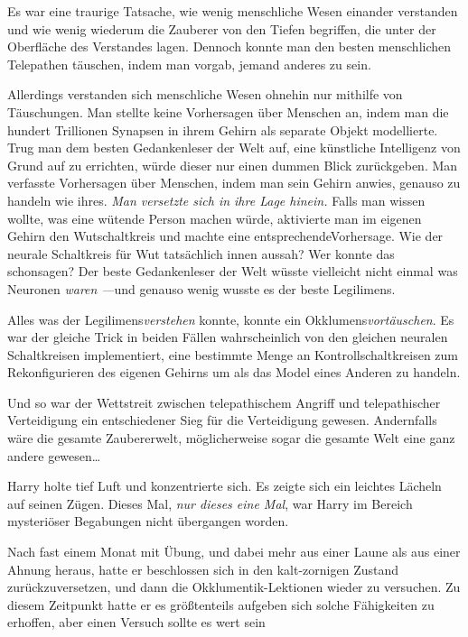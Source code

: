 {Es war eine traurige Tatsache, wie wenig menschliche Wesen einander verstanden und wie wenig wiederum die Zauberer von den Tiefen begriffen, die unter der Oberfläche des Verstandes lagen. Dennoch konnte man den besten menschlichen Telepathen täuschen, indem man vorgab, jemand anderes zu sein.

Allerdings verstanden sich menschliche Wesen ohnehin nur mithilfe von Täuschungen. Man stellte keine Vorhersagen über Menschen an, indem man die hundert Trillionen Synapsen in ihrem Gehirn als separate Objekt modellierte. Trug man dem besten Gedankenleser der Welt auf, eine künstliche Intelligenz von Grund auf zu errichten, würde dieser nur einen dummen Blick zurückgeben. Man verfasste Vorhersagen über Menschen, indem man sein Gehirn anwies, genauso zu handeln wie ihres. \emph{Man versetzte sich in ihre Lage hinein.} Falls man wissen wollte, was eine wütende Person machen würde, aktivierte man im eigenen Gehirn den Wutschaltkreis und machte eine entsprechendeVorhersage. Wie der neurale Schaltkreis für Wut tatsächlich innen aussah? Wer konnte das schonsagen? Der beste Gedankenleser der Welt wüsste vielleicht nicht einmal was Neuronen \emph{waren} \emph{—}und genauso wenig wusste es der beste Legilimens.

Alles was der Legilimens\emph{verstehen} konnte, konnte ein Okklumens\emph{vortäuschen}. Es war der gleiche Trick in beiden Fällen \later wahrscheinlich von den gleichen neuralen Schaltkreisen implementiert, eine bestimmte Menge an Kontrollschaltkreisen zum Rekonfigurieren des eigenen Gehirns um als das Model eines Anderen zu handeln.

Und so war der Wettstreit zwischen telepathischem Angriff und telepathischer Verteidigung ein entschiedener Sieg für die Verteidigung gewesen. Andernfalls wäre die gesamte Zaubererwelt, möglicherweise sogar die gesamte Welt eine ganz andere gewesen…

Harry holte tief Luft und konzentrierte sich. Es zeigte sich ein leichtes Lächeln auf seinen Zügen. Dieses Mal, \emph{nur dieses eine Mal}, war Harry im Bereich mysteriöser Begabungen nicht übergangen worden.

Nach fast einem Monat mit Übung, und dabei mehr aus einer Laune als aus einer Ahnung heraus, hatte er beschlossen sich in den kalt-zornigen Zustand zurückzuversetzen, und dann die Okklumentik-Lektionen wieder zu versuchen. Zu diesem Zeitpunkt hatte er es größtenteils aufgeben sich solche Fähigkeiten zu erhoffen, aber einen Versuch sollte es wert sein \later

}

